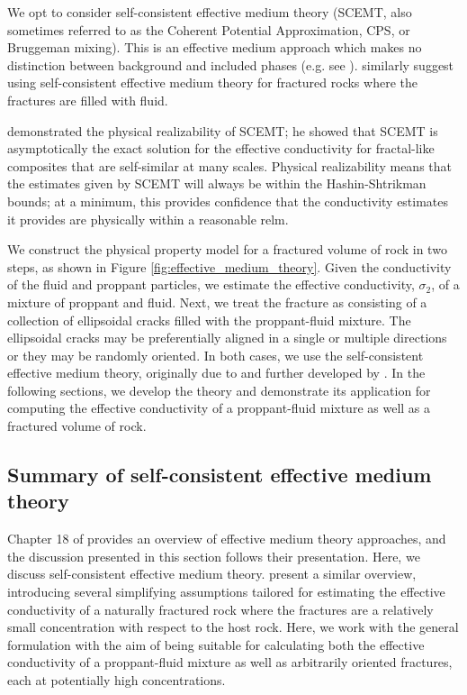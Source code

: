 We opt to consider self-consistent effective medium theory (SCEMT, also sometimes referred to as the Coherent Potential Approximation, CPS, or Bruggeman mixing). This is an effective medium approach which makes no distinction between background and included phases (e.g. see \cite{Torquato2002}). \cite{Berryman2013} similarly suggest using self-consistent effective medium theory for fractured rocks where the fractures are filled with fluid.

\cite{Milton1985} demonstrated the physical realizability of SCEMT; he showed that SCEMT is asymptotically the exact solution for the effective conductivity for fractal-like composites that are self-similar at many scales. Physical realizability means that the estimates given by SCEMT will always be within the Hashin-Shtrikman bounds; at a minimum, this provides confidence that the conductivity estimates it provides are physically within a reasonable relm.

We construct the physical property model for a fractured volume of rock in two steps, as shown in Figure \ref{fig:effective_medium_theory}. Given the conductivity of the fluid and proppant particles, we estimate the effective conductivity, $\sigma_2$, of a mixture of proppant and fluid. Next, we treat the fracture as consisting of a collection of ellipsoidal cracks filled with the proppant-fluid mixture. The ellipsoidal cracks may be preferentially aligned in a single or multiple directions or they may be randomly oriented. In both cases, we use the self-consistent effective medium theory, originally due to \cite{Bruggeman1935} and further developed by \cite{Landauer1952, Landauer1978}. In the following sections, we develop the theory and demonstrate its application for computing the effective conductivity of a proppant-fluid mixture as well as a fractured volume of rock.






\subsection{Summary of self-consistent effective medium theory}
\label{sect:emt_math}

Chapter 18 of \cite{Torquato2002} provides an overview of effective medium theory approaches, and the discussion presented in this section follows their presentation. Here, we discuss self-consistent effective medium theory. \cite{Berryman2013} present a similar overview, introducing several simplifying assumptions tailored for estimating the effective conductivity of a naturally fractured rock where the fractures are a relatively small concentration with respect to the host rock. Here, we work with the general formulation with the aim of being suitable for calculating both the effective conductivity of a proppant-fluid mixture as well as arbitrarily oriented fractures, each at potentially high concentrations.

